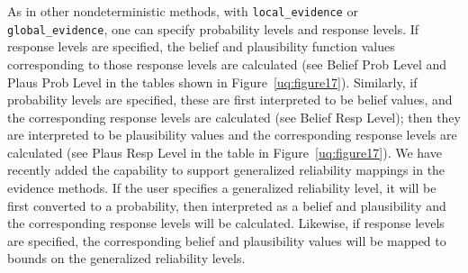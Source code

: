 As in other nondeterministic methods, with \texttt{local\_evidence}
or \texttt{global\_evidence},
one can specify probability levels and response levels. 
If response levels are specified, the belief and plausibility 
function values corresponding to those response levels are calculated 
(see Belief Prob Level and Plaus Prob Level in the tables shown in 
Figure~\ref{uq:figure17}).  Similarly, if probability levels are 
specified, these are first interpreted to be belief values, and the 
corresponding response levels are calculated (see Belief Resp Level); 
then they are interpreted to be plausibility values and the 
corresponding response levels are calculated (see Plaus Resp Level in 
the table in Figure~\ref{uq:figure17}).  We have recently added the 
capability to support generalized reliability mappings in 
the evidence methods.  If the user specifies a generalized 
reliability level, it will be first converted to a probability, 
then interpreted as a belief and plausibility and the corresponding 
response levels will be calculated. Likewise, if response levels 
are specified, the corresponding belief and plausibility values 
will be mapped to bounds on the generalized reliability levels. 

